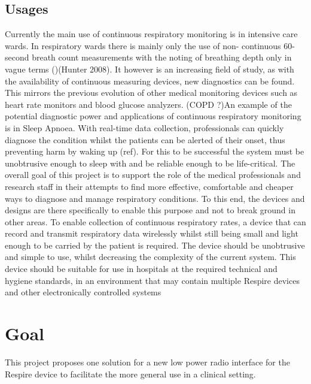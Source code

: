 \subsection{Usages}
Currently the main use of continuous respiratory monitoring is in intensive
care wards. In respiratory wards there is mainly only the use of non-
continuous 60-second breath count measurements with the noting of
breathing depth only in vague terms ()(Hunter 2008). It however is an
increasing field of study, as with the availability of continuous measuring
devices, new diagnostics can be found. This mirrors the previous evolution of other medical
monitoring devices such as heart rate monitors and blood glucose analyzers.
(COPD ?)An example of the potential diagnostic power and applications of continuous respiratory
monitoring is in Sleep Apnoea. With real-time data collection, professionals can quickly diagnose the
condition whilst the patients can be alerted of their onset, thus preventing harm by waking up (ref).
For this to be successful the system must be unobtrusive enough to
sleep with and be reliable enough to be life-critical.
The overall goal of this project is to support the role of the medical
professionals and research staff in their attempts to find more
effective, comfortable and cheaper ways to diagnose and manage
respiratory conditions. To this end, the devices and designs are there specifically to enable this
purpose and not to break ground in other areas.
To enable collection of continuous respiratory rates, a device that can record and transmit
respiratory data wirelessly whilst still being small and light enough to be carried by the patient is
required. The device should be unobtrusive and simple to use, whilst decreasing the complexity of
the current system. This device should be suitable for use in hospitals at the required technical and
hygiene standards, in an environment that may contain multiple Respire devices and other
electronically controlled systems

\section{Goal}
This project proposes one solution for a new low power radio interface for the Respire device to
facilitate the more general use in a clinical setting.

